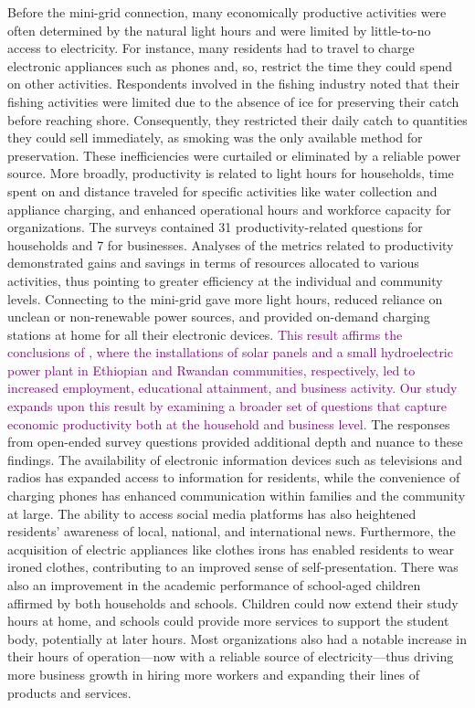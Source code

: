 Before the mini-grid connection, many economically productive activities were often determined by the natural light hours and were limited by little-to-no access to electricity. For instance, many residents had to travel to charge electronic appliances such as phones and, so, restrict the time they could spend on other activities.
Respondents involved in the fishing industry noted that their fishing activities were limited due to the absence of ice for preserving their catch before reaching shore. Consequently, they restricted their daily catch to quantities they could sell immediately, as smoking was the only available method for preservation.
These inefficiencies were curtailed or eliminated by a reliable power source. More broadly, productivity is related to light hours for households, time spent on and distance traveled for specific activities like water collection and appliance charging, and enhanced operational hours and workforce capacity for organizations. The surveys contained 31 productivity-related questions for households and 7 for businesses. Analyses of the metrics related to productivity demonstrated gains and savings in terms of resources allocated to various activities, thus pointing to greater efficiency at the individual and community levels. Connecting to the mini-grid gave more light hours, reduced reliance on unclean or non-renewable power sources, and provided on-demand charging stations at home for all their electronic devices. \textcolor{purple}{This result affirms the conclusions of \cite{wassie2021socio, uwineza2021analysis}, where the installations of solar panels and a small hydroelectric power plant in Ethiopian and Rwandan communities, respectively, led to increased employment, educational attainment, and business activity. Our study expands upon this result by examining a broader set of questions that capture economic productivity both at the household and business level.}
The responses from open-ended survey questions provided additional depth and nuance to these findings. The availability of electronic information devices such as televisions and radios has expanded access to information for residents, while the convenience of charging phones has enhanced communication within families and the community at large. The ability to access social media platforms has also heightened residents' awareness of local, national, and international news. Furthermore, the acquisition of electric appliances like clothes irons has enabled residents to wear ironed clothes, contributing to an improved sense of self-presentation.
There was also an improvement in the academic performance of school-aged children affirmed by both households and schools. Children could now extend their study hours at home, and schools could provide more services to support the student body, potentially at later hours. Most organizations also had a notable increase in their hours of operation---now with a reliable source of electricity---thus driving more business growth in hiring more workers and expanding their lines of products and services.

